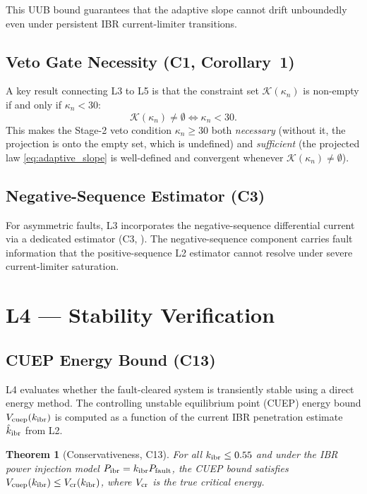 \documentclass[journal,twoside,10pt]{IEEEtran}
\newcommand{\kappan}{\kappa_{n}}
\newcommand{\kibr}{k_{\rm ibr}}
\newcommand{\calK}{\mathcal{K}}
\newcommand{\hatkibr}{\hat{k}_{\rm ibr}}
\newtheorem{theorem}{Theorem}
\begin{document}
This UUB bound guarantees that the adaptive slope cannot drift
unboundedly even under persistent IBR current-limiter transitions.

\subsection{Veto Gate Necessity (C1, Corollary~1)}

A key result connecting L3 to L5 is that the constraint set
$\calK(\kappan)$ is non-empty if and only if $\kappan < 30$:
\[
  \calK(\kappan) \neq \emptyset \iff \kappan < 30.
\]
This makes the Stage-2 veto condition $\kappan \geq 30$ both
\emph{necessary} (without it, the projection is onto the empty set,
which is undefined) and \emph{sufficient} (the projected law
\eqref{eq:adaptive_slope} is well-defined and convergent whenever
$\calK(\kappan) \neq \emptyset$).

\subsection{Negative-Sequence Estimator (C3)}

For asymmetric faults, L3 incorporates the negative-sequence
differential current via a dedicated estimator (C3,
\cite{sambps_c3_negseq}).  The negative-sequence component carries
fault information that the positive-sequence L2 estimator cannot
resolve under severe current-limiter saturation.

\section{L4 — Stability Verification}
\label{sec:L4}

\subsection{CUEP Energy Bound (C13)}

L4 evaluates whether the fault-cleared system is transiently stable
using a direct energy method.  The controlling unstable equilibrium
point (CUEP) energy bound $V_{\rm cuep}(\kibr)$ is computed as a
function of the current IBR penetration estimate $\hatkibr$ from L2.

\begin{theorem}[Conservativeness, C13]
For all $\kibr \leq 0.55$ and under the IBR power injection model
$P_{\rm ibr} = \kibr P_{\rm fault}$, the CUEP bound satisfies
$V_{\rm cuep}(\kibr) \leq V_{\rm cr}(\kibr)$, where $V_{\rm cr}$ is
the true critical energy.
\end{theorem}
\end{document}
